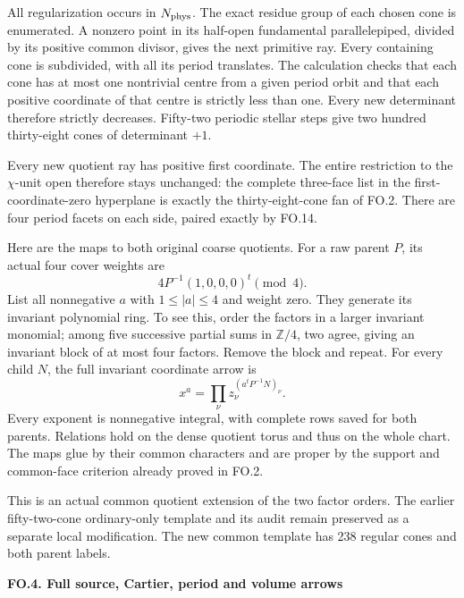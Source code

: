 All regularization occurs in \(N_{\rm phys}\). The
exact residue group of each chosen cone is enumerated.
A nonzero point in its half-open fundamental
parallelepiped, divided by its positive common divisor,
gives the next primitive ray. Every containing cone is
subdivided, with all its period translates. The
calculation checks that each cone has at most one
nontrivial centre from a given period orbit and that
each positive coordinate of that centre is strictly
less than one. Every new determinant therefore strictly
decreases. Fifty-two periodic stellar steps give
two hundred thirty-eight cones of determinant \(+1\).

Every new quotient ray has positive first coordinate.
The entire restriction to the \(\chi\)-unit open
therefore stays unchanged: the complete three-face list
in the first-coordinate-zero hyperplane is exactly the
thirty-eight-cone fan of FO.2. There are four period
facets on each side, paired exactly by FO.14.

Here are the maps to both original coarse quotients.
For a raw parent \(P\), its actual four cover weights are
\[
 4P^{-1}(1,0,0,0)^t\pmod4.                                \tag{FO.15}
\]
List all nonnegative \(a\) with \(1\le|a|\le4\) and
weight zero. They generate its invariant polynomial
ring. To see this, order the factors in a larger
invariant monomial; among five successive partial
sums in \(\mathbb Z/4\), two agree, giving an invariant
block of at most four factors. Remove the block and
repeat. For every child \(N\), the full invariant
coordinate arrow is
\[
 x^a=\prod_\nu z_\nu^{(a^tP^{-1}N)_\nu}.                  \tag{FO.16}
\]
Every exponent is nonnegative integral, with complete
rows saved for both parents. Relations hold on the
dense quotient torus and thus on the whole chart.
The maps glue by their common characters and are
proper by the support and common-face criterion
already proved in FO.2.

This is an actual common quotient extension of the
two factor orders. The earlier fifty-two-cone
ordinary-only template and its audit remain preserved
as a separate local modification. The new common
template has 238 regular cones and both parent labels.

\par

\medskip\noindent\textbf{FO.4. Full source, Cartier, period and volume arrows}

\par\nobreak

